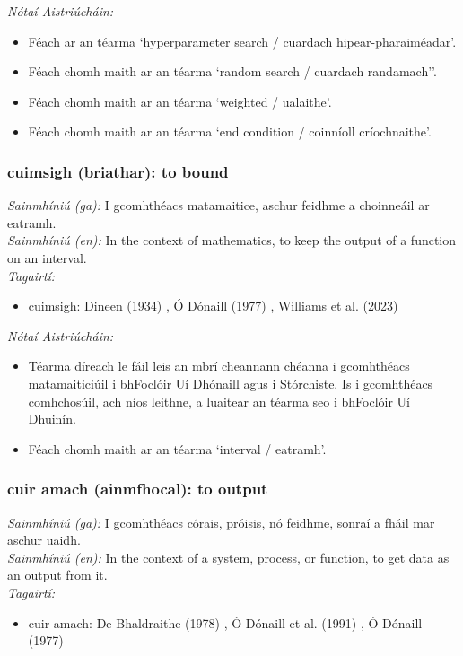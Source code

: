  \noindent \textit{Nótaí Aistriúcháin:}
\begin{itemize}
	\item Féach ar an téarma `hyperparameter search / cuardach hipear-pharaiméadar'.
	\item Féach chomh maith ar an téarma `random search / cuardach randamach''.
	\item Féach chomh maith ar an téarma `weighted / ualaithe'.
	\item Féach chomh maith ar an téarma `end condition / coinníoll críochnaithe'.
\end{itemize}


\subsubsection*{cuimsigh (briathar): to bound}
 \noindent \textit{Sainmhíniú (ga):} I gcomhthéacs matamaitice, aschur feidhme a choinneáil ar eatramh.
\\
 \noindent \textit{Sainmhíniú (en):} In the context of mathematics, to keep the output of a function on an interval.
\\
 \noindent \textit{Tagairtí:}
\begin{itemize}
	\item cuimsigh: Dineen (1934) \cite{dineen}, Ó Dónaill (1977) \cite{odonaill}, Williams et al. (2023) \cite{storchiste}
\end{itemize}

 \noindent \textit{Nótaí Aistriúcháin:}
\begin{itemize}
	\item Téarma díreach le fáil leis an mbrí cheannann chéanna i gcomhthéacs matamaiticiúil i bhFoclóir Uí Dhónaill agus i Stórchiste. Is i gcomhthéacs comhchosúil, ach níos leithne, a luaitear an téarma seo i bhFoclóir Uí Dhuinín.
	\item Féach chomh maith ar an téarma `interval / eatramh'.
\end{itemize}


\subsubsection*{cuir amach (ainmfhocal): to output}
 \noindent \textit{Sainmhíniú (ga):} I gcomhthéacs córais, próisis, nó feidhme, sonraí a fháil mar aschur uaidh.
\\
 \noindent \textit{Sainmhíniú (en):} In the context of a system, process, or function, to get data as an output from it.
\\
 \noindent \textit{Tagairtí:}
\begin{itemize}
	\item cuir amach: De Bhaldraithe (1978) \cite{de-bhaldraithe}, Ó Dónaill et al. (1991) \cite{focloir-beag}, Ó Dónaill (1977) \cite{odonaill}
\end{itemize}

